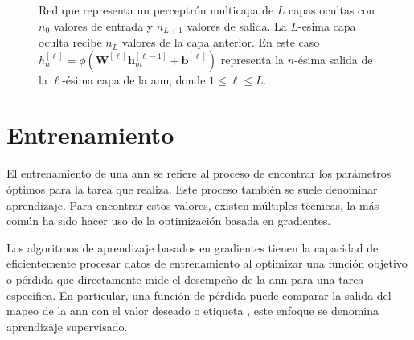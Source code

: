 \begin{figure}[t]
	\caption{Red que representa un perceptrón multicapa de $L$ capas ocultas con $n_0$ valores de entrada y $n_{L+1}$ valores de salida. La $L$-esima capa oculta recibe $n_{L}$ valores de la capa anterior. En este caso $h_{n}^{[\ell]} = \phi\left(\mathbf{W}^{[\ell]}\mathbf{h}_{m}^{[\ell -1]} + \mathbf{b}^{[\ell]}\right) $ representa la $n$-ésima salida de la $\ell$-ésima capa de la \acrshort{ann}, donde $1 \leq \ell \leq L$.}	
 \label{fig:multilayer-perceptron}
\end{figure}

\section{Entrenamiento}
El entrenamiento de una \acrshort{ann} se refiere al proceso de encontrar los parámetros óptimos para la tarea que realiza. Este proceso también se suele denominar aprendizaje. Para encontrar estos valores, existen múltiples técnicas, la más común ha sido hacer uso de la optimización basada en gradientes. \cite{Goodfellow-et-al-2016}

Los algoritmos de aprendizaje basados en gradientes tienen la capacidad de eficientemente procesar datos de entrenamiento al optimizar una función objetivo o pérdida que directamente mide el desempeño de la \acrshort{ann} para una tarea específica. En particular, una función de pérdida puede comparar la salida del mapeo de la \acrshort{ann} con el valor deseado o etiqueta \cite{Roberts_2022}, este enfoque se denomina aprendizaje supervisado.

